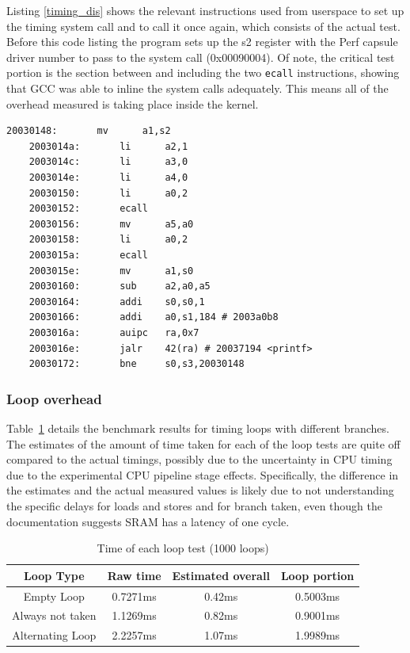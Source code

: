 \documentclass{article}
\begin{document}
Listing \ref{timing_dis} shows the relevant instructions used from userspace to set up the timing system call and to call it once again, which consists of the actual test. Before this code listing the program sets up the s2 register with the Perf capsule driver number to pass to the system call (0x00090004). Of note, the critical test portion is the section between and including the two \texttt{ecall} instructions, showing that GCC was able to inline the system calls adequately. This means all of the overhead measured is taking place inside the kernel.

\begin{lstlisting}[caption={Timing overhead benchmark disassembly}, label={timing_dis}]
    20030148:       mv      a1,s2
    2003014a:       li      a2,1
    2003014c:       li      a3,0
    2003014e:       li      a4,0
    20030150:       li      a0,2
    20030152:       ecall
    20030156:       mv      a5,a0
    20030158:       li      a0,2
    2003015a:       ecall
    2003015e:       mv      a1,s0
    20030160:       sub     a2,a0,a5
    20030164:       addi    s0,s0,1
    20030166:       addi    a0,s1,184 # 2003a0b8
    2003016a:       auipc   ra,0x7
    2003016e:       jalr    42(ra) # 20037194 <printf>
    20030172:       bne     s0,s3,20030148
\end{lstlisting}

\subsubsection{Loop overhead} \label{subsubsec:loop_overhead_meas}

Table~\ref{table:loop-overhead} details the benchmark results for timing loops with different branches. The estimates of the amount of time taken for each of the loop tests are quite off compared to the actual timings, possibly due to the uncertainty in CPU timing due to the experimental CPU pipeline stage effects. Specifically, the difference in the estimates and the actual measured values is likely due to not understanding the specific delays for loads and stores and for branch taken, even though the documentation suggests SRAM has a latency of one cycle.

\begin{table}[htp]
\centering
\begin{tabular}{|c||c|c|c|}
 \hline
 Loop Type & Raw time & Estimated overall & Loop portion \\
 \hline\hline
 Empty Loop & 0.7271ms & 0.42ms & 0.5003ms\\
 \hline
 Always not taken & 1.1269ms & 0.82ms  & 0.9001ms\\
 \hline
 Alternating Loop & 2.2257ms & 1.07ms  & 1.9989ms\\
 \hline
\end{tabular}
\caption{Time of each loop test (1000 loops)}
\label{table:loop-overhead}
\end{table}
\end{document}
